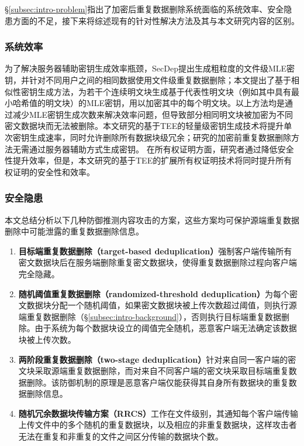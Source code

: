 \S\ref{subsec:intro-problem}指出了加密后重复数据删除系统面临的系统效率、安全隐患方面的不足，接下来将综述现有的针对性解决方法及其与本文研究内容的区别。

\subsubsection{系统效率}
\label{subsubsec:compare-deduplication-performance}

为了解决服务器辅助密钥生成效率瓶颈，SecDep\cite{zhou2015secdep}提出生成粗粒度的文件级MLE密钥，并针对不同用户之间的相同数据使用文件级重复数据删除；本文提出了基于相似性密钥生成方法\cite{qin17}，为若干个连续明文块生成基于代表性明文块（例如其中具有最小哈希值的明文块）的MLE密钥，用以加密其中的每个明文块。以上方法均是通过减少MLE密钥生成次数来解决效率问题，但导致部分相同明文块被加密为不同密文数据块而无法被删除。本文研究的基于TEE的轻量级密钥生成技术将提升单次密钥生成速率，同时允许删除所有数据块级冗余；研究的加密前重复数据删除方法无需通过服务器辅助方式生成密钥。
在所有权证明方面，研究者通过降低安全性提升效率\cite{xu2013weak,pietro12}，但是，本文研究的基于TEE的扩展所有权证明技术将同时提升所有权证明的安全性和效率。

\subsubsection{安全隐患}
\label{subsubsec:compare-deduplication-security}

本文总结分析以下几种防御推测内容攻击的方案，这些方案均可保护源端重复数据删除中可能泄露的重复数据删除信息。

\begin{enumerate}
    \item \textbf{目标端重复数据删除（target-based deduplication）}\cite{harnik10}强制客户端传输所有密文数据块后在服务端删除重复密文数据块，使得重复数据删除过程向客户端完全隐藏。
    \item \textbf{随机阈值重复数据删除（randomized-threshold deduplication）}\cite{harnik10}为每个密文数据块分配一个随机阈值，如果密文数据块被上传次数超过阈值，则执行源端重复数据删除（\S\ref{subsec:intro-background}），否则执行目标端重复数据删除。由于系统为每个数据块设立的阈值完全随机，恶意客户端无法确定该数据块被上传次数。
    \item \textbf{两阶段重复数据删除（two-stage deduplication）}\cite{li2015cdstore}针对来自同一客户端的密文块采取源端重复数据删除，而对来自不同客户端的密文块采取目标端重复数据删除。该防御机制的原理是恶意客户端仅能获得其自身所有数据块的重复数据删除信息。
    \item \textbf{随机冗余数据块传输方案（RRCS）}\cite{zuo2018mitigating}工作在文件级别，其通知每个客户端传输上传文件中的多个随机的重复数据块，以及相应的非重复数据块，这样攻击者无法在重复和非重复的文件之间区分传输的数据块个数。 
\end{enumerate}

